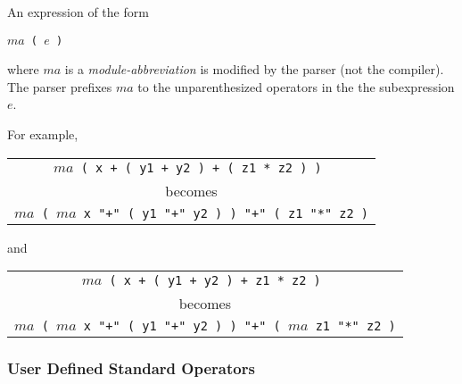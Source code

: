 \documentclass[12pt]{article}
\begin{document}
An expression of the form
\begin{center}
\tt $ma$ ( $e$ )
\label{MODULE-ABBREVIATION-SEMANTICS}
\end{center}
where $ma$ is a {\em module-abbreviation} is modified
by the parser (not the compiler).  The parser prefixes
$ma$ to the unparenthesized operators in the the subexpression $e$.

For example,
\begin{center}
\begin{tabular}{c}
\tt $ma$ ( x + ( y1 + y2 ) + ( z1 * z2 ) ) \\
becomes \\
\tt $ma$ ( $ma$ x "+" ( y1 "+" y2 ) ) "+" ( z1 "*" z2 )
\end{tabular}
\end{center}
and
\begin{center}
\begin{tabular}{c}
\tt $ma$ ( x + ( y1 + y2 ) + z1 * z2 ) \\
becomes \\
\tt $ma$ ( $ma$ x "+" ( y1 "+" y2 ) ) "+" ( $ma$ z1 "*" z2 )
\end{tabular}
\end{center}

\subsubsection{User Defined Standard Operators}
\label{USER-DEFINED-STANDARD-OPERATORS}
\end{document}
